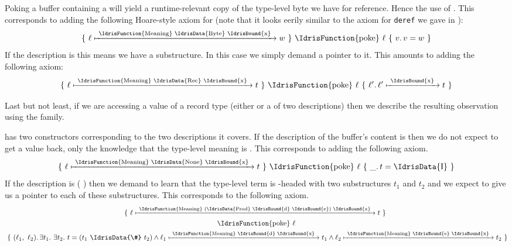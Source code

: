 
Poking a buffer containing a  will yield a
runtime-relevant copy of the type-level byte we have for
reference. Hence the use of .
This corresponds to adding the following Hoare-style axiom
for  (note that it looks eerily
similar to the axiom for \texttt{deref} we gave in
):
\[ \Hoare
     {\Pointer{\ell}{\text{\IdrisFunction{Meaning} \IdrisData{Byte} \IdrisBound{x}}}{w}}
     {\text{\IdrisFunction{poke}}~\ell}
     {v}{v = w}
\]
If the description is  this means
we have a substructure. In this case we simply demand
a pointer to it. This amounts to adding the following
axiom:
\[ \Hoare
     {\Pointer{\ell}{\text{\IdrisFunction{Meaning} \IdrisData{Rec} \IdrisBound{x}}}{t}}
     {\text{\IdrisFunction{poke}}~\ell}
     {\ell^{\prime}}{\Pointer{\ell^{\prime}}{\text{\IdrisBound{x}}}{t}}
\]

Last but not least, if we are accessing a value of a
record type (either  or a  of two descriptions)
then we describe the resulting observation using the  family.


 has two constructors corresponding to the two
descriptions it covers.
%
If the description of the buffer's content is 
then we do not expect to get a value back, only the knowledge
that the type-level meaning is . This corresponds
to adding the following axiom.
\[ \Hoare
     {\Pointer{\ell}{\text{\IdrisFunction{Meaning} \IdrisData{None} \IdrisBound{x}}}{t}}
     {\text{\IdrisFunction{poke}}~\ell}
     {\_}{t = \text{\IdrisData{I}}}
\]
If the description is (  )
then we demand to learn that the type-level term is \IdrisData{(\#)}-headed
with two substructures $t_1$ and $t_2$ and we expect
 to give us a pointer to each of these substructures.
This corresponds to the following axiom.
\begin{gather*}
  \Hoare
     {\Pointer{\ell}{\text{\IdrisFunction{Meaning} (\IdrisData{Prod} \IdrisBound{d} \IdrisBound{e}) \IdrisBound{x}}}{t}}
     {\\\text{\IdrisFunction{poke}}~\ell\\}
     {(\ell_1,~\ell_2)}
     {\exists t_1.~ \exists t_2.~
       t = (t_1 ~\text{\IdrisData{\#}}~ t_2)
       \wedge \Pointer{\ell_1}{\text{\IdrisFunction{Meaning} \IdrisBound{d} \IdrisBound{x}}}{t_1}
       \wedge \Pointer{\ell_2}{\text{\IdrisFunction{Meaning} \IdrisBound{e} \IdrisBound{x}}}{t_2}}
\end{gather*}


